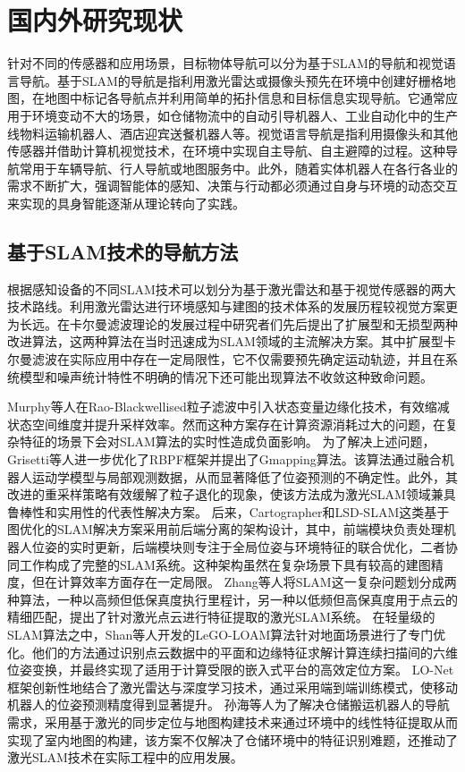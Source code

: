 \section{国内外研究现状}
    针对不同的传感器和应用场景，目标物体导航可以分为基于SLAM的导航和视觉语言导航。基于SLAM的导航是指利用激光雷达或摄像头预先在环境中创建好栅格地图，在地图中标记各导航点并利用简单的拓扑信息和目标信息实现导航。它通常应用于环境变动不大的场景，如仓储物流中的自动引导机器人、工业自动化中的生产线物料运输机器人、酒店迎宾送餐机器人等。视觉语言导航是指利用摄像头和其他传感器并借助计算机视觉技术，在环境中实现自主导航、自主避障的过程。这种导航常用于车辆导航、行人导航或地图服务中。此外，随着实体机器人在各行各业的需求不断扩大，强调智能体的感知、决策与行动都必须通过自身与环境的动态交互来实现的具身智能逐渐从理论转向了实践。

\subsection{基于SLAM技术的导航方法}
	
	根据感知设备的不同SLAM技术可以划分为基于激光雷达和基于视觉传感器的两大技术路线。利用激光雷达进行环境感知与建图的技术体系的发展历程较视觉方案更为长远。在卡尔曼滤波理论的发展过程中研究者们先后提出了扩展型和无损型两种改进算法，这两种算法在当时迅速成为SLAM领域的主流解决方案。其中扩展型卡尔曼滤波在实际应用中存在一定局限性，它不仅需要预先确定运动轨迹，并且在系统模型和噪声统计特性不明确的情况下还可能出现算法不收敛这种致命问题。


	Murphy\cite{murphy2001rao}等人在Rao-Blackwellised粒子滤波中引入状态变量边缘化技术，有效缩减状态空间维度并提升采样效率。然而这种方案存在计算资源消耗过大的问题，在复杂特征的场景下会对SLAM算法的实时性造成负面影响。
	为了解决上述问题，Grisetti\cite{grisetti2005improving, grisetti2007improved}等人进一步优化了RBPF框架并提出了Gmapping算法。该算法通过融合机器人运动学模型与局部观测数据，从而显著降低了位姿预测的不确定性。此外，其改进的重采样策略有效缓解了粒子退化的现象，使该方法成为激光SLAM领域兼具鲁棒性和实用性的代表性解决方案。
	后来，Cartographer\cite{hess2016real}和LSD-SLAM\cite{engel2014lsd}这类基于图优化的SLAM解决方案采用前后端分离的架构设计，其中，前端模块负责处理机器人位姿的实时更新，后端模块则专注于全局位姿与环境特征的联合优化，二者协同工作构成了完整的SLAM系统。这种架构虽然在复杂场景下具有较高的建图精度，但在计算效率方面存在一定局限。
	Zhang\cite{zhang2017low}等人将SLAM这一复杂问题划分成两种算法，一种以高频但低保真度执行里程计，另一种以低频但高保真度用于点云的精细匹配，提出了针对激光点云进行特征提取的激光SLAM系统。
	在轻量级的SLAM算法之中，Shan\cite{shan2018lego}等人开发的LeGO-LOAM算法针对地面场景进行了专门优化。他们的方法通过识别点云数据中的平面和边缘特征求解计算连续扫描间的六维位姿变换，并最终实现了适用于计算受限的嵌入式平台的高效定位方案。
	LO-Net\cite{li2019net}框架创新性地结合了激光雷达与深度学习技术，通过采用端到端训练模式，使移动机器人的位姿预测精度得到显著提升。
	孙海\cite{孙海2017激光测距在仓储搬运机器人运动中的应用}等人为了解决仓储搬运机器人的导航需求，采用基于激光的同步定位与地图构建技术来通过环境中的线性特征提取从而实现了室内地图的构建，该方案不仅解决了仓储环境中的特征识别难题，还推动了激光SLAM技术在实际工程中的应用发展。
	
